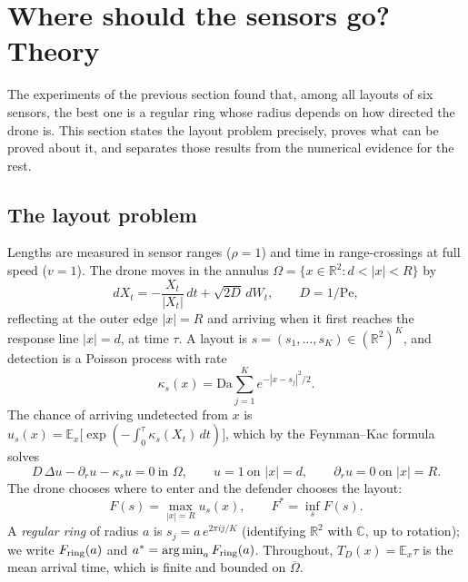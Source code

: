 \documentclass[11pt]{article}
\theoremstyle{remark}
\newcommand{\R}{\mathbb{R}}
\newcommand{\E}{\mathbb{E}}
\newcommand{\Da}{\mathrm{Da}}
\newcommand{\Pe}{\mathrm{Pe}}
\DeclareMathOperator*{\argmin}{arg\,min}
\begin{document}
\section{Where should the sensors go? Theory}\label{sec:theory}

The experiments of the previous section found that, among all layouts of six
sensors, the best one is a regular ring whose radius depends on how directed the drone is.
This section states the layout problem precisely, proves what can be proved about it, and
separates those results from the numerical evidence for the rest.

\subsection{The layout problem}
Lengths are measured in sensor ranges ($\rho=1$) and time in range-crossings at full speed
($v=1$). The drone moves in the annulus $\Omega=\{x\in\R^2: d<|x|<R\}$ by
\begin{equation}\label{eq:sde}
dX_t=-\frac{X_t}{|X_t|}\,dt+\sqrt{2D}\,dW_t ,\qquad D=1/\Pe ,
\end{equation}
reflecting at the outer edge $|x|=R$ and arriving when it first reaches the response line
$|x|=d$, at time $\tau$. A layout is $s=(s_1,\dots,s_K)\in(\R^2)^K$, and detection is a
Poisson process with rate
\begin{equation}\label{eq:kappa}
\kappa_s(x)=\Da\sum_{j=1}^K e^{-|x-s_j|^2/2}.
\end{equation}
The chance of arriving undetected from $x$ is
$u_s(x)=\E_x\big[\exp(-\int_0^\tau\kappa_s(X_t)\,dt)\big]$, which by the Feynman--Kac formula
solves
\begin{equation}\label{eq:pde}
D\,\Delta u-\partial_r u-\kappa_s u=0\ \text{in }\Omega,\qquad u=1\ \text{on }|x|=d,\qquad
\partial_r u=0\ \text{on }|x|=R .
\end{equation}
The drone chooses where to enter and the defender chooses the layout:
\begin{equation}\label{eq:minimax}
F(s)=\max_{|x|=R}u_s(x),\qquad F^*=\inf_{s}F(s).
\end{equation}
A \emph{regular ring} of radius $a$ is $s_j=a\,e^{2\pi i j/K}$ (identifying $\R^2$ with
$\mathbb{C}$, up to rotation); we write $F_{\rm ring}(a)$ and $a^*=\argmin_a F_{\rm ring}(a)$.
Throughout, $T_D(x)=\E_x\tau$ is the mean arrival time, which is finite and bounded on
$\overline\Omega$.
\end{document}

